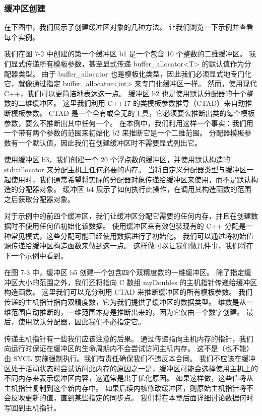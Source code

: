 \subsubsection{缓冲区创建}
在下图中，我们展示了创建缓冲区对象的几种方法。 让我们浏览一下示例并查看每个实例。

我们在图 7-2 中创建的第一个缓冲区 b1 是一个包含 10 个整数的二维缓冲区。 我们显式传递所有模板参数，甚至显式传递 buffer\_allocator<T> 的默认值作为分配器类型。 由于 buffer\_allocator 也是模板化类型，因此我们必须显式地专门化它，就像通过指定 buffer\_allocator<int> 来专门化缓冲区一样。 然而，使用现代 C++，我们可以更简洁地表达这一点。 缓冲区 b2 也是使用默认分配器的十个整数的二维缓冲区。 这里我们利用 C++17 的类模板参数推导（CTAD）来自动推断模板参数。 CTAD 是一个全有或全无的工具，它必须要么推断出类的每个模板参数，要么不推断出其中任何一个。 在本例中，我们利用这样一个事实：我们用一个带有两个参数的范围来初始化 b2 来推断它是一个二维范围。 分配器模板参数有一个默认值，因此我们在创建缓冲区时不需要显式列出它。

使用缓冲区 b3，我们创建一个 20 个浮点数的缓冲区，并使用默认构造的 std::allocator 来分配主机上任何必要的内存。 当将自定义分配器类型与缓冲区一起使用时，我们通常希望将实际的分配器对象传递给缓冲区来使用，而不是默认构造的分配器对象。 缓冲区 b4 展示了如何执行此操作，在调用其构造函数的范围之后获取分配器对象。

对于示例中的前四个缓冲区，我们让缓冲区分配它需要的任何内存，并且在创建数据时不使用任何值初始化该数据。 使用缓冲区来有效包装现有的 C++ 分配是一种常见模式，这些分配可能已经使用数据进行了初始化。 我们可以通过将初始值源传递给缓冲区构造函数来做到这一点。 这样做可以让我们做几件事，我们将在下一个示例中看到。

在图 7-3 中，缓冲区 b5 创建一个包含四个双精度数的一维缓冲区。 除了指定缓冲区大小的范围之外，我们还将指向 C 数组 myDoubles 的主机指针传递给缓冲区构造函数。 这里我们可以充分利用 CTAD 来推断缓冲区的所有模板参数。 我们传递的主机指针指向双精度数，它为我们提供了缓冲区的数据类型。 维数是从一维范围自动推断的，一维范围本身是推断出来的，因为它仅由一个数字创建。 最后，使用默认分配器，因此我们不必指定它。

传递主机指针有一些我们应该注意的后果。 通过传递指向主机内存的指针，我们向运行时保证在缓冲区的生命周期内不会尝试访问主机内存。 这不是（也不能）由 SYCL 实施强制执行。我们有责任确保我们不违反本合同。 我们不应该在缓冲区处于活动状态时尝试访问此内存的原因之一是，缓冲区可能会选择使用主机上的不同内存来表示缓冲区内容，这通常是出于优化原因。 如果这样做，这些值将从主机指针复制到这个新内存中。 如果后续内核修改缓冲区，则原始主机指针将不会反映更新的值，直到某些指定的同步点。 我们将在本章后面详细讨论数据何时写回到主机指针。

